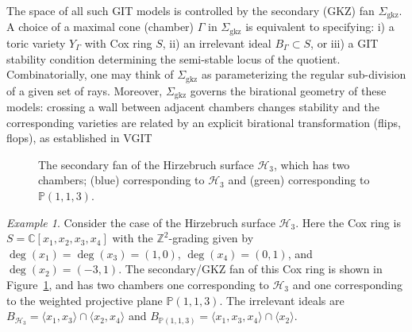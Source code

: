 \documentclass[11pt,reqno]{amsart}
\theoremstyle{remark}
\newtheorem{example}[lemma]{Example}
\newcommand{\GKZ}{\operatorname{gkz}}
\newcommand{\CC}{\mathbb{C}}
\newcommand{\PP}{\mathbb{P}}
\newcommand{\ZZ}{\mathbb{Z}}
\newcommand{\cH}{\mathcal{H}}
\begin{document}
The space of all such GIT models is controlled by the secondary (GKZ) fan $\Sigma_{\GKZ}$. A choice of a maximal cone (chamber) $\Gamma$ in $\Sigma_{\GKZ}$ is equivalent to specifying: i) a toric variety $Y_{\Gamma}$ with Cox ring $S$, ii) an irrelevant ideal $B_{\Gamma} \subset S$, or iii) a GIT stability condition determining the semi-stable locus of the quotient. Combinatorially, one may think of $\Sigma_{\GKZ}$ as parameterizing the regular sub-division of a given set of rays. Moreover, $\Sigma_{\GKZ}$ governs the birational geometry of these models: crossing a wall between adjacent chambers changes stability and the corresponding varieties are related by an explicit birational transformation (flips, flops), as established in VGIT \cite{CLS11}

\begin{center}
\begin{figure}\label{fig:example-of-secondary}
\newcommand{\makegrid}{
  \path[use as bounding box] (-3.45,-3.25) rectangle (5.45,5.25);
  \foreach \x in {-5,...,5}
  \foreach \y in {-2,...,5}
    { \fill[Gray,fill=gray] (\x,\y) circle (1.5pt); }
  \draw[-,  semithick] (-6,0)--(6,0);
  \draw[-,  semithick] (0,-2)--(0,6);
}

\caption{The secondary fan of the Hirzebruch surface $\cH_3$, which has two chambers; (blue) corresponding to $\cH_3$ and (green) corresponding to $\PP(1,1,3)$. }
\end{figure}
\end{center}

\begin{example}\label{exm:hirzebruch}
Consider the case of the Hirzebruch surface $\cH_3$. Here the Cox ring is $S=\CC[x_1,x_2,x_3,x_4]$ with the $\ZZ^2$-grading given by $\deg(x_1)=\deg(x_3)=(1,0)$, $\deg(x_4)=(0,1)$, and $\deg(x_2)=(-3,1)$. The secondary/GKZ fan of this Cox ring is shown in Figure~\ref{fig:example-of-secondary}, and has two chambers one corresponding to $\cH_3$ and one corresponding to the weighted projective plane $\PP(1,1,3)$. The irrelevant ideals are $B_{\cH_3}=\langle x_1, x_3\rangle \cap \langle x_2, x_4\rangle$ and $B_{\PP(1,1,3)}=\langle x_1, x_3, x_4\rangle \cap \langle x_2 \rangle$.

\end{example}
\end{document}
